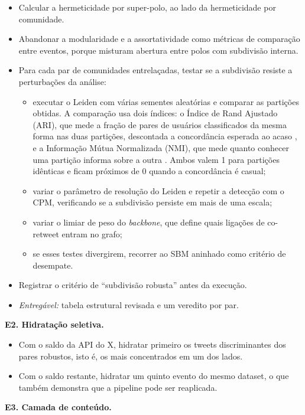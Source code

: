 \documentclass[12pt,a4paper,oneside]{article}
\begin{document}
\begin{itemize}
\item Calcular a hermeticidade por super-polo, ao lado da hermeticidade por comunidade.
\item Abandonar a modularidade e a assortatividade como métricas de comparação entre eventos, porque misturam abertura entre polos com subdivisão interna.
\item Para cada par de comunidades entrelaçadas, testar se a subdivisão resiste a perturbações da análise:
  \begin{itemize}
  \item executar o Leiden com várias sementes aleatórias e comparar as partições obtidas. A comparação usa dois índices: o Índice de Rand Ajustado (ARI), que mede a fração de pares de usuários classificados da mesma forma nas duas partições, descontada a concordância esperada ao acaso \cite{hubert1985}, e a Informação Mútua Normalizada (NMI), que mede quanto conhecer uma partição informa sobre a outra \cite{danon2005}. Ambos valem 1 para partições idênticas e ficam próximos de 0 quando a concordância é casual;
  \item variar o parâmetro de resolução do Leiden e repetir a detecção com o CPM, verificando se a subdivisão persiste em mais de uma escala;
  \item variar o limiar de peso do \emph{backbone}, que define quais ligações de co-retweet entram no grafo;
  \item se esses testes divergirem, recorrer ao SBM aninhado como critério de desempate.
  \end{itemize}
\item Registrar o critério de ``subdivisão robusta'' antes da execução.
\item \emph{Entregável:} tabela estrutural revisada e um veredito por par.
\end{itemize}

\textbf{E2. Hidratação seletiva.}

\begin{itemize}
\item Com o saldo da API do X, hidratar primeiro os tweets discriminantes dos pares robustos, isto é, os mais concentrados em um dos lados.
\item Com o saldo restante, hidratar um quinto evento do mesmo dataset, o que também demonstra que a pipeline pode ser reaplicada.
\end{itemize}

\textbf{E3. Camada de conteúdo.}
\end{document}
